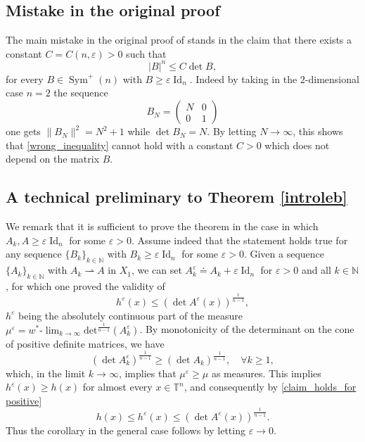 \documentclass[10pt,reqno]{amsart}
\numberwithin{equation}{section}
\newcommand{\T}{\mathbb{T}}
\newcommand{\N}{\mathbb{N}}
\newcommand{\eps}{\varepsilon}
\DeclareMathOperator{\Id}{Id}
\DeclareMathOperator{\Sym}{Sym}
\theoremstyle{plain}
\theoremstyle{definition}
\theoremstyle{remark}
\begin{document}
\subsection{Mistake in the original proof}\label{error} The main mistake in the original proof of \cite[Cor. 7]{USC} stands in the claim that there exists a constant $C=C(n,\varepsilon)>0$ such that 
\begin{equation}\label{wrong_inequality}
|B|^n\leq C \det B,
\end{equation} 
for every $B\in \Sym^+(n)$ with $B\geq \varepsilon \Id_n$.  Indeed by taking in the $2$-dimensional case $n=2$ the sequence 
$$
B_N = 
\begin{pmatrix}
N & 0 \\
0 & 1
\end{pmatrix}
$$
one gets $\|B_N\|^2=N^2+1$ while $\det B_N=N$. By letting $N\rightarrow \infty$, this shows that \eqref{wrong_inequality} cannot hold with a constant $C>0$ which does not depend on the matrix $B$.

\subsection{A technical preliminary to Theorem \ref{introleb}}\label{pos}

 We remark that it is sufficient to prove the theorem in the case in which $A_k, A\geq \varepsilon \Id_n$ for some $\varepsilon>0$. Assume indeed that the statement holds true for any sequence $\{B_k\}_{k \in \N}$ with $B_k \ge \eps \Id_n$ for some $\eps> 0$. Given a sequence $\{A_k\}_{k \in \N}$ with $A_k \rightharpoonup A$ in $X_1$, we can set $A_{k}^\eps \doteq A_k + \eps\Id_n$ for $\eps > 0$ and all $k \in \N$, for which one proved the validity of 
 \begin{equation}\label{claim_holds_for positive}
h^\eps (x)\leq \left(\det A^\eps(x)\right)^\frac{1}{n-1},
  \end{equation}
 $h^\eps$ being the absolutely continuous part of the measure $\mu^\eps=w{^*}\text{-}\lim_{k\rightarrow \infty}\text{det}^{\frac{1}{n-1}} (A^\eps_k)$.
By monotonicity of the determinant on the cone of positive definite matrices, we have
$$
\left(\det A_k^\eps\right)^\frac{1}{n-1}\ge\left(\det A_k\right)^\frac{1}{n-1}, \quad \forall k\geq 1,
$$
which, in the limit $k\rightarrow \infty$, implies that $\mu^\eps \geq \mu$ as measures. This implies $h^\eps(x) \geq h(x)$ for almost every $x\in \T^n$, and consequently by \eqref{claim_holds_for positive}
$$
h(x)\leq h^\eps (x) \leq  \left(\det A^\eps(x)\right)^\frac{1}{n-1}.
$$
Thus the corollary in the general case follows by letting $\varepsilon\rightarrow 0$.
\end{document}
